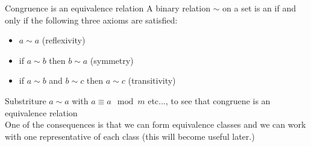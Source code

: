     \begin{parag}{Congruence is an equivalence relation}
        A binary relation $ \sim$ on a set is an  if and only if the following three axioms are satisfied:
        \begin{itemize}
            \item $a \sim a$ (reflexivity)
            \item if $ a \sim b$ then $ b \sim a$ (symmetry)
            \item if $ a \sim b$ and $b \sim c$ then $ a \sim c$ (transitivity)
        \end{itemize}
        Substriture $a \sim a$ with $ a \equiv a \mod m$ etc...,  to see that congruene is an equivalence relation\\
        One of the consequences is that we can form equivalence classes and we can work with one representative of each class (this will become useful later.)
    
    \end{parag}
    
